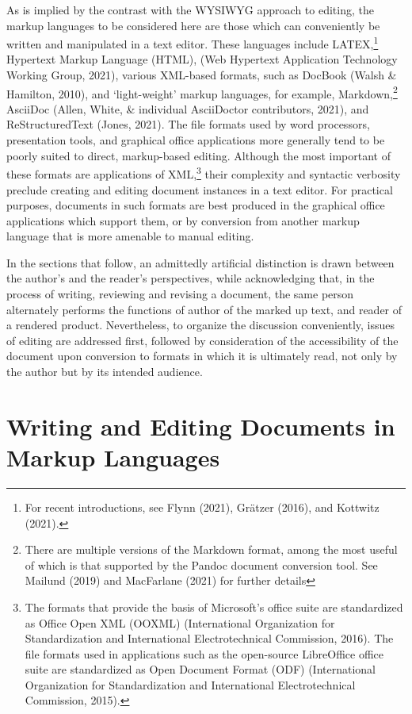 \documentclass[11pt]{sig-alternate}
\begin{document}
\begin{large}
As is implied by the contrast with the WYSIWYG approach to editing, the markup langua\-ges to be considered here are those which can conveniently be written and manipulated in a text editor. These languages include LATEX,\footnote{For recent introductions, see Flynn (2021), Grätzer (2016), and Kottwitz (2021).} Hypertext Markup Language (HTML), (Web Hypertext Application Technology Working Gr\-oup, 2021), various XML-based formats, such as DocBook (Walsh \& Hamilton, 2010), and ‘light-weight’ markup languages, for example, Markdown,\footnote{There are multiple versions of the Markdown format, among the most useful of which is that supported by the Pandoc document conversion tool. See Mailund (2019) and MacFarlane (2021) for further details} AsciiDoc (Allen, White, \& individual AsciiDoctor contributors, 2021), and ReStructuredText (Jones, 2021). The file formats used by word processors, presentation tools, and graphical office applications more generally tend to be poorly suited to direct, markup-based editing. Although the most important of these formats are applications of XML,\footnote{The formats that provide the basis of Microsoft’s office suite are standardized as Office Open XML (OOXML) (International Organization for Standardization and International Electrotechnical Commission, 2016). The file formats used in applications such as the open-source LibreOffice office suite are standardized as Open Document Format (ODF) (International Organization for Standardization and International Electrotechnical Commission, 2015).} their complexity and syntactic verbosity preclude creating and editing document instances in a text editor. For practical purposes, documents in such formats are best produced in the graphical office applications which support them, or by conversion from another markup language that is more amenable to manual editing.

In the sections that follow, an admittedly artificial distinction is drawn between the author’s and the reader’s perspectives, while acknowledging that, in the process of writing, reviewing and revising a document, the same person alternately performs the functions of author of the marked up text, and reader of a rendered product. Nevertheless, to organize the discussion conveniently, issues of editing are addressed first, followed by consideration of the accessibility of the document upon conversion to formats in which it is ultimately read, not only by the author but by its intended audience.

\section*{Writing and Editing Documents in \\Markup Languages}


\end{large}
\end{document}
